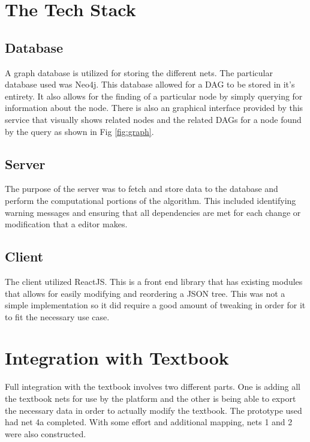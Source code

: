 \section{The Tech Stack}

\subsection{Database}

A graph database is utilized for storing the different nets. The particular database used was Neo4j. This database allowed for a DAG to be stored in it's entirety. It also allows for the finding of a particular node by simply querying for information about the node. There is also an graphical interface provided by this service that visually shows related nodes and the related DAGs for a node found by the query as shown in Fig \ref{fig:graph}.

\subsection{Server}

The purpose of the server was to fetch and store data to the database and perform the computational portions of the algorithm. This included identifying warning messages and ensuring that all dependencies are met for each change or modification that a editor makes. 

\subsection{Client}

The client utilized ReactJS. This is a front end library that has existing modules that allows for easily modifying and reordering a JSON tree. This was not a simple implementation so it did require a good amount of tweaking in order for it to fit the necessary use case.

\section{Integration with Textbook}

Full integration with the textbook involves two different parts. One is adding all the textbook nets for use by the platform and the other is being able to export the necessary data in order to actually modify the textbook. The prototype  used had net 4a completed. With some effort and additional mapping, nets 1 and 2 were also constructed.

